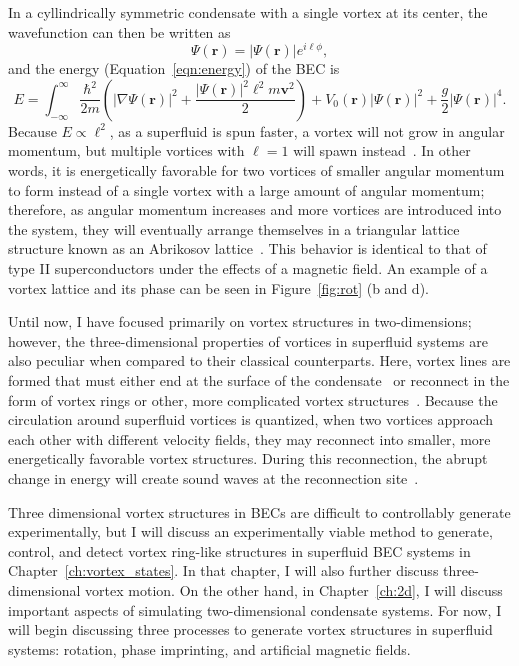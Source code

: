 In a cyllindrically symmetric condensate with a single vortex at its center, the wavefunction can then be written as
\begin{equation}
\Psi(\mathbf{r}) = |\Psi(\mathbf{r})|e^{i\ell\phi},
\end{equation}
and the energy (Equation~\eqref{eqn:energy}) of the BEC is
\begin{equation}
E = \int_{-\infty}^\infty \frac{\hbar^2}{2m}\left( |\nabla\Psi(\mathbf{r})|^2 + \frac{|\Psi(\mathbf{r})|^2\ell^2 m\mathbf{v}^2}{2}\right) + V_0(\mathbf{r})|\Psi(\mathbf{r})|^2 + \frac{g}{2}|\Psi(\mathbf{r})|^4.
\end{equation}
\noindent Because $E \propto \ell^2$, as a superfluid is spun faster, a vortex will not grow in angular momentum, but multiple vortices with $\ell = 1$ will spawn instead~\cite{pethick2002}.
In other words, it is energetically favorable for two vortices of smaller angular momentum to form instead of a single vortex with a large amount of angular momentum;
therefore, as angular momentum increases and more vortices are introduced into the system, they will eventually arrange themselves in a triangular lattice structure known as an Abrikosov lattice~\cite{abrikosov1957, fetter2001}.
This behavior is identical to that of type II superconductors under the effects of a magnetic field.
An example of a vortex lattice and its phase can be seen in Figure~\ref{fig:rot} (b and d).

Until now, I have focused primarily on vortex structures in two-dimensions; however, 
the three-dimensional properties of vortices in superfluid systems are also peculiar when compared to their classical counterparts.
Here, vortex lines are formed that must either end at the surface of the condensate~\cite{madison2000} or reconnect in the form of vortex rings or other, more complicated vortex structures~\cite{reichl2013, barenghi2014}.
Because the circulation around superfluid vortices is quantized, when two vortices approach each other with different velocity fields, they may reconnect into smaller, more energetically favorable vortex structures.
During this reconnection, the abrupt change in energy will create sound waves at the reconnection site~\cite{feynman1955}.

Three dimensional vortex structures in BECs are difficult to controllably generate experimentally, but I will discuss an experimentally viable method to generate, control, and detect vortex ring-like structures in superfluid BEC systems in Chapter~\ref{ch:vortex_states}.
In that chapter, I will also further discuss three-dimensional vortex motion.
On the other hand, in Chapter~\ref{ch:2d}, I will discuss important aspects of simulating two-dimensional condensate systems.
 For now, I will begin discussing three processes to generate vortex structures in superfluid systems: rotation, phase imprinting, and artificial magnetic fields.

